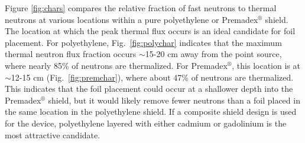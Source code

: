 \documentclass{mc2015}
\begin{document}
Figure \ref{fig:chars} compares the relative fraction of fast neutrons to thermal neutrons at various locations within a pure polyethylene or Premadex$^\circledR$ shield. The location at which the peak thermal flux occurs is an ideal candidate for foil placement. For polyethylene, Fig.\ \ref{fig:polychar} indicates that the maximum thermal neutron flux fraction occurs $\sim$15-20 cm away from the point source, where nearly 85\% of neutrons are thermalized. For Premadex$^\circledR$, this location is at $\sim$12-15 cm (Fig.\ \ref{fig:premchar}), where about 47\% of neutrons are thermalized. This indicates that the foil placement could occur at a shallower depth into the Premadex$^\circledR$ shield, but it would likely remove fewer neutrons than a foil placed in the same location in the polyethylene shield. If a composite shield design is used for the device, polyethylene layered with either cadmium or gadolinium is the most attractive candidate. 
\end{document}
